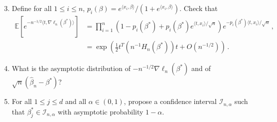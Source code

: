 \documentclass[a4paper,10pt,fleqn]{article}
\newcommand{\eqsp}{\,}
\newcommand{\1}{\ensuremath{\mathbbm{1}}}
\newcommand{\bE}{\mathbb{E}}
\begin{document}
\begin{enumerate}  \setcounter{enumi}{2}
\item Define for all $1\leqslant i \leqslant n$, $p_{i}(\beta)=e^{\langle x_{i},\beta\rangle}/ \left(1+e^{\langle x_{i},\beta\rangle}\right)$. Check that
\begin{align*}
\bE \left[e^{-n^{-1/2}\langle t,\nabla\ell_{n}(\beta^*)\rangle}\right]& =\prod_{i=1}^n \left({1-p_{i}(\beta^*)+p_{i}(\beta^*)e^{\langle t,x_{i}\rangle/\sqrt{n}}}\right) e^{-p_{i}(\beta^*)\langle t,x_{i}\rangle/\sqrt{n}}\eqsp, \\
&=\exp\left(\frac{1}{2}t^T\left(n^{-1}H_{n}(\beta^*)\right)t+O(n^{-1/2})\right)\eqsp.
\end{align*}
\item What is the asymptotic distribution of $-n^{-1/2}\nabla\ell_{n}(\beta^*)$ and of $\sqrt{n}(\widehat \beta_n-\beta^*)$?
\item For all $1\leqslant j \leqslant d$ and all $\alpha\in(0,1)$, propose a confidence interval $\mathcal{I}_{n,\alpha}$ such that $\beta^*_{j}\in \mathcal{I}_{n,\alpha}$ with asymptotic probability $1-\alpha$.
\end{enumerate}
\end{document}
